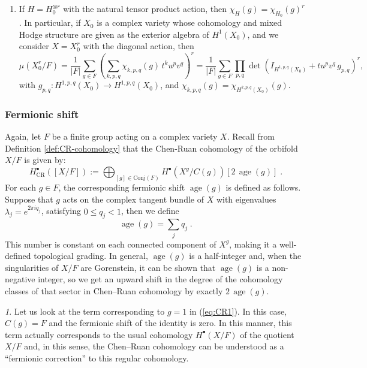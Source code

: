 \documentclass[11pt,english]{amsart}
\numberwithin{equation}{section}
\numberwithin{figure}{section}
\theoremstyle{plain}
\theoremstyle{plain}
\theoremstyle{definition}
\theoremstyle{remark}
\newtheorem{rem}[thm]{\protect\remarkname}
\newcommand{\age}{\operatorname{age}}
\providecommand{\remarkname}{Remark}
\begin{document}
\begin{enumerate}
    where again $g_{p,q}: H^{1, p, q}(X) \to H^{1, p, q}(X)$ is the induced action on the $(p,q)$-piece. 
    \item\label{item:product} If $H = H_0^{\otimes r}$ with the natural tensor product action, then $\chi_H(g) = \chi_{H_0}(g)^r$. In particular, if $X_0$ is a complex variety whose cohomology and mixed Hodge structure are given as the exterior algebra of $H^1(X_0)$, and we consider $X = X_0^r$ with the diagonal action, then
    $$
    \mu(X_0^r/F) = \frac{1}{|F|}\sum_{g \in F}\left(\sum_{k,p,q} \chi_{k,p,q}(g) \,t^ku^pv^q\right)^r = \frac{1}{|F|}\sum_{g \in F} \prod_{p,q}\det(I_{H^{1, p, q}(X_0)} + tu^pv^q\,g_{p,q})^r,
    $$
    with $g_{p,q}: H^{1,p,q}(X_0) \to H^{1,p,q}(X_0)$, and $\chi_{k,p,q}(g)=\chi_{H^{k,p,q}(X_0)}(g)$.
\end{enumerate}

\subsubsection{Fermionic shift}
\label{subsec:age-shift}
Again, let $F$ be a finite group acting on a complex variety $X$. Recall from Definition \ref{def:CR-cohomology} that the Chen-Ruan cohomology of the orbifold $X/F$ is given by:
\begin{equation}\label{eq:CR1}
H^\bullet_{\text{CR}}([X/F]) := \bigoplus_{[g] \in \text{Conj}(F)} H^{\bullet}(X^g / C(g))[2 \, \age(g)]\; .
\end{equation}
For each $g\in F$, the corresponding fermionic shift $\age(g)$ is defined as follows. Suppose that $g$ acts on the complex tangent bundle of $X$ with eigenvalues $\lambda_j = e^{2\pi i q_j}$, satisfying $0 \le q_j < 1$, then we define $$\age(g) = \sum_{j} q_j\; .$$ 
This number is constant on each connected component of $X^{g}$, making it a well-defined topological grading.
In general, $\age(g)$ is a half-integer and, when the singularities of $X/F$ are Gorenstein, it can be shown that $\age(g)$ is a non-negative integer, so we get an 
upward shift in the degree of the cohomology classes of that sector in Chen--Ruan cohomology by exactly $2\,\age(g)$. 

\begin{rem}\label{rem:first-term}
Let us look at the term corresponding to $g = 1$ in (\ref{eq:CR1}). In this case, $C(g) = F$ and the fermionic shift of the identity is zero. In this manner, this term actually corresponds to the usual cohomology $H^\bullet(X/F)$ of the quotient $X/F$ and, in this sense, the Chen--Ruan cohomology can be understood as a ``fermionic correction'' to this regular cohomology. 
\end{rem}
\end{document}
